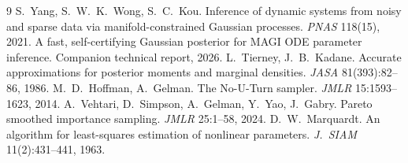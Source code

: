 \documentclass[11pt]{article}
\theoremstyle{plain}
\theoremstyle{definition}
\theoremstyle{remark}
\begin{document}
\begin{thebibliography}{9}
\small
{} S.~Yang, S.~W.~K.~Wong, S.~C.~Kou.
  Inference of dynamic systems from noisy and sparse data via manifold-constrained Gaussian
  processes. \emph{PNAS} 118(15), 2021.
 A fast, self-certifying Gaussian posterior for MAGI ODE parameter inference.
  Companion technical report, 2026.
 L.~Tierney, J.~B.~Kadane.
  Accurate approximations for posterior moments and marginal densities.
  \emph{JASA} 81(393):82--86, 1986.
 M.~D.~Hoffman, A.~Gelman.
  The No-U-Turn sampler. \emph{JMLR} 15:1593--1623, 2014.
 A.~Vehtari, D.~Simpson, A.~Gelman, Y.~Yao, J.~Gabry.
  Pareto smoothed importance sampling. \emph{JMLR} 25:1--58, 2024.
 D.~W.~Marquardt.
  An algorithm for least-squares estimation of nonlinear parameters.
  \emph{J.~SIAM} 11(2):431--441, 1963.
\end{thebibliography}
\end{document}
